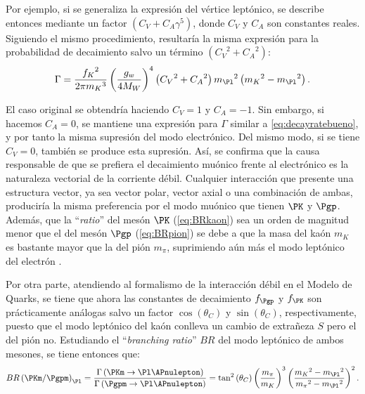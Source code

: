 Por ejemplo, si se generaliza la expresión del vértice leptónico, se describe entonces mediante un factor $\left( C_{V}+C_{A}\gamma^{5} \right)$, donde $C_{V}$ y $C_{A}$ son constantes reales. Siguiendo el mismo procedimiento, resultaría la misma expresión para la probabilidad de decaimiento salvo un término $\left( {C_{V}}^2+{C_{A}}^2\right)$:
\begin{equation}
\Gamma =\dfrac{{f_{K}}^{2}}{2\pi {m_{K}}^{3}}\left( \dfrac{g_w}{4M_W}\right)^{4}\left( {C_{V}}^2+{C_{A}}^2\right){m_{\Pl}}^{2}\left({m_{K}}^{2}-{m_{\Pl}}^{2}\right) .\label{eq:decayrateEWt}
\end{equation}

El caso original se obtendría haciendo $C_{V}=1$ y $C_{A}=-1$. Sin embargo, si hacemos $C_{A}=0$, se mantiene una expresión para $\Gamma$ similar a \ref{eq:decayratebueno}, y por tanto la misma supresión del modo electrónico. Del mismo modo, si se tiene $C_{V}=0$, también se produce esta supresión. Así, se confirma que la causa responsable de que se prefiera el decaimiento muónico frente al electrónico es la naturaleza vectorial de la corriente débil. Cualquier interacción que presente una estructura vector, ya sea vector polar, vector axial o una combinación de ambas, produciría la misma preferencia por el modo muónico que tienen $\PK$ y $\Pgp$. Además, que la ``\textit{ratio}'' del mesón $\PK$ (\ref{eq:BRkaon}) sea un orden de magnitud menor que el del mesón $\Pgp$ (\ref{eq:BRpion}) se debe a que la masa del kaón $m_{K}$ es bastante mayor que la del pión $m_{\pi}$, suprimiendo aún más el modo leptónico del electrón \cite{Renton}.

Por otra parte, atendiendo al formalismo de la interacción débil en el Modelo de Quarks, se tiene que ahora las constantes de decaimiento $f_{\Pgp}$ y $f_{\PK}$ son prácticamente análogas salvo un factor $\cos \left( \theta _{C}\right)$ y $\sin \left( \theta _{C}\right)$, respectivamente, puesto que el modo leptónico del kaón conlleva un cambio de extrañeza $S$ pero el del pión no. Estudiando el ``\textit{branching ratio}'' $BR$ del modo leptónico de ambos mesones, se tiene entonces que:
\begin{equation}
BR\left(\PKm / \Pgpm\right)_{\Pl}=\dfrac{\Gamma \left( \PKm \rightarrow \Pl \APnulepton\right) }{\Gamma \left( \Pgpm \rightarrow \Pl \APnulepton\right)}=\tan ^{2}\left( \theta _{C}\right) \left( \dfrac{m_{\pi}}{m_{K}}\right) ^{3}\left( \dfrac{{m_{K}}^{2}-{m_{\Pl}}^{2}}{{m_{\pi}}^{2}-{m_{\Pl}}^{2}}\right) ^{2} .
\end{equation}

